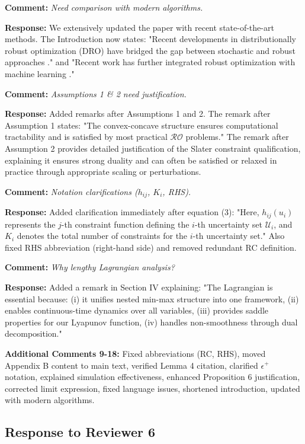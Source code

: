\documentclass[journal,twoside,web]{ieeecolor}
\begin{document}
\textbf{Comment:} \textit{Need comparison with modern algorithms.}

\textbf{Response:} We extensively updated the paper with recent state-of-the-art methods. The Introduction now states: "Recent developments in distributionally robust optimization (DRO) have bridged the gap between stochastic and robust approaches \cite{aigner2023,yang2023}." and "Recent work has further integrated robust optimization with machine learning \cite{zhu2023zeroth,madry2018adversarial}." 

\textbf{Comment:} \textit{Assumptions 1 \& 2 need justification.}

\textbf{Response:} Added remarks after Assumptions 1 and 2. The remark after Assumption 1 states: "The convex-concave structure ensures computational tractability and is satisfied by most practical $\mathcal{RO}$ problems." The remark after Assumption 2 provides detailed justification of the Slater constraint qualification, explaining it ensures strong duality and can often be satisfied or relaxed in practice through appropriate scaling or perturbations.

\textbf{Comment:} \textit{Notation clarifications ($h_{ij}$, $K_i$, RHS).}

\textbf{Response:} Added clarification immediately after equation (3): "Here, $h_{ij}(u_i)$ represents the $j$-th constraint function defining the $i$-th uncertainty set $\mathcal{U}_i$, and $K_i$ denotes the total number of constraints for the $i$-th uncertainty set." Also fixed RHS abbreviation (right-hand side) and removed redundant RC definition.

\textbf{Comment:} \textit{Why lengthy Lagrangian analysis?}

\textbf{Response:} Added a remark in Section IV explaining: "The Lagrangian is essential because: (i) it unifies nested min-max structure into one framework, (ii) enables continuous-time dynamics over all variables, (iii) provides saddle properties for our Lyapunov function, (iv) handles non-smoothness through dual decomposition."

\textbf{Additional Comments 9-18:} Fixed abbreviations (RC, RHS), moved Appendix B content to main text, verified Lemma 4 citation, clarified $\epsilon^+$ notation, explained simulation effectiveness, enhanced Proposition 6 justification, corrected limit expression, fixed language issues, shortened introduction, updated with modern algorithms.

\subsection*{Response to Reviewer 6}
\end{document}
